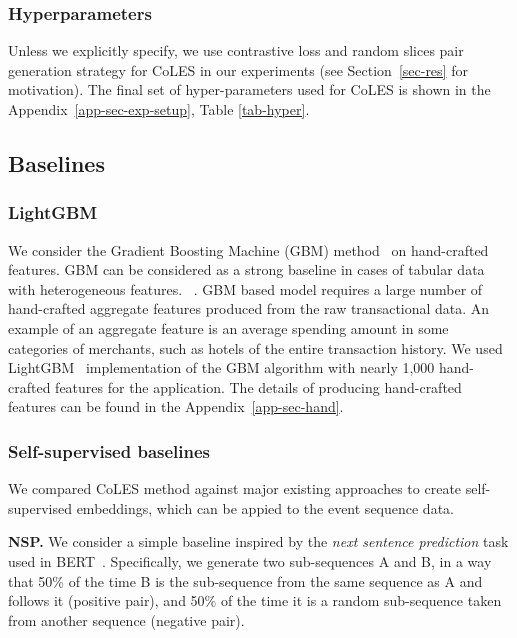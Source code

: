 \documentclass[sigconf]{acmart}
\begin{document}
\subsubsection{Hyperparameters}

Unless we explicitly specify, we use contrastive loss and random slices pair generation strategy for CoLES in our experiments (see Section~\ref{sec-res} for motivation). The final set of hyper-parameters used for CoLES is shown in the Appendix~\ref{app-sec-exp-setup}, Table \ref{tab-hyper}.

\subsection{Baselines} \label{sec-baselines}


\subsubsection{LightGBM}

We consider the Gradient Boosting Machine (GBM) method~\citep{Friedman2001GreedyFA} on hand-crafted features. GBM can be considered as a strong baseline in cases of tabular data with heterogeneous features.
~\citep{Wu2009AdaptingBF, Vorobev2019LearningTS, Zhang2015AGB, Niu2019ACS}.
GBM based model requires a large number of hand-crafted aggregate features produced from the raw transactional data. An example of an aggregate feature is an average spending amount in some categories of merchants, such as hotels of the entire transaction history.
We used LightGBM~\citep{Ke2017LightGBMAH} implementation of the GBM algorithm with nearly 1,000 hand-crafted features for the application. The details of producing hand-crafted features can be found in the Appendix~\ref{app-sec-hand}.

\subsubsection{Self-supervised baselines} 

We compared CoLES method against major existing approaches to create self-supervised embeddings, which can be appied to the event sequence data.

\textbf{NSP.} We consider a simple baseline inspired by the \textit{next sentence prediction} task used in BERT~\citep{Devlin2019BERTPO}. Specifically, we generate two sub-sequences A and B, in a way that 50\% of the time B is the sub-sequence from the same sequence as A and follows it (positive pair), and 50\% of the time it is a random sub-sequence taken from another sequence (negative pair).
\end{document}

